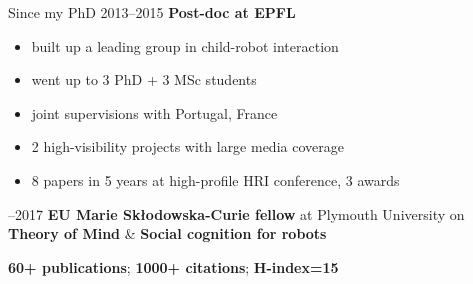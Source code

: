 \documentclass[compress]{beamer}
\begin{document}
\begin{frame}{Since my PhD}
    2013--2015  \textbf{Post-doc at EPFL}
    \begin{itemize}
        \item<+-> built up a leading group in child-robot interaction
        \item<+-> went up to 3 PhD + 3 MSc students
        \item<+-> joint supervisions with Portugal, France
        \item<+-> 2 high-visibility projects with large media coverage
        \item<+-> 8 papers in 5 years at high-profile HRI conference, 3 awards
    \end{itemize}

    --2017 \textbf{EU Marie Skłodowska-Curie fellow} at Plymouth University on
    \textbf{Theory of Mind} \& \textbf{Social cognition for robots}


    \vspace{1em}
    \large\centering
    \textbf{60+ publications}; \textbf{1000+ citations}; \textbf{H-index=15}

\end{frame}

\end{document}
